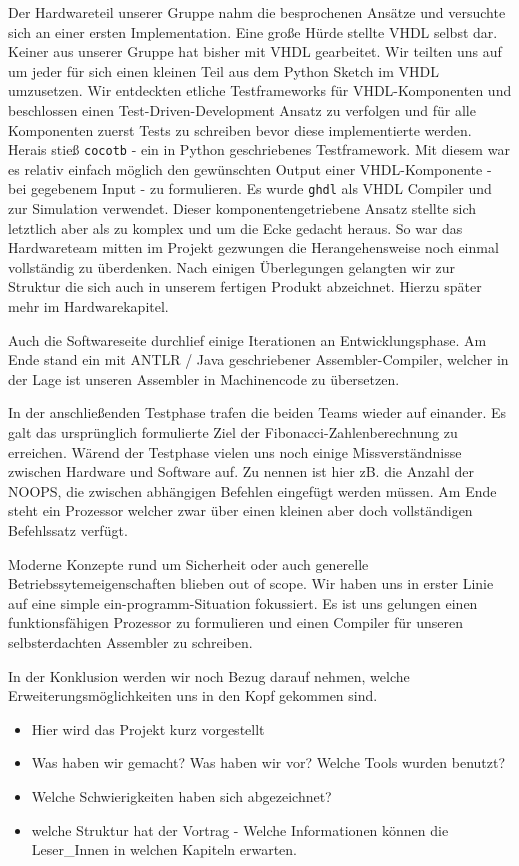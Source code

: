 \documentclass[paper=a4,fontsize=12pt,twocolumn]{scrreprt}
\begin{document}
Der Hardwareteil unserer Gruppe nahm die besprochenen Ansätze und versuchte sich an einer ersten Implementation.
Eine große Hürde stellte VHDL selbst dar.
Keiner aus unserer Gruppe hat bisher mit VHDL gearbeitet.
Wir teilten uns auf um jeder für sich einen kleinen Teil aus dem Python Sketch im VHDL umzusetzen.
Wir entdeckten etliche Testframeworks für VHDL-Komponenten und beschlossen einen Test-Driven-Development Ansatz zu verfolgen und für alle Komponenten zuerst Tests zu schreiben bevor diese implementierte werden.
Herais stieß \texttt{cocotb} - ein in Python geschriebenes Testframework.
Mit diesem war es relativ einfach möglich den gewünschten Output einer VHDL-Komponente - bei gegebenem Input - zu formulieren.
Es wurde \texttt{ghdl} als VHDL Compiler und zur Simulation verwendet.
Dieser komponentengetriebene Ansatz stellte sich letztlich aber als zu komplex und um die Ecke gedacht heraus.
So war das Hardwareteam mitten im Projekt gezwungen die Herangehensweise noch einmal vollständig zu überdenken.
Nach einigen Überlegungen gelangten wir zur Struktur die sich auch in unserem fertigen Produkt abzeichnet.
Hierzu später mehr im Hardwarekapitel.

Auch die Softwareseite durchlief einige Iterationen an Entwicklungsphase.
Am Ende stand ein mit ANTLR / Java geschriebener Assembler-Compiler, welcher in der Lage ist unseren Assembler in Machinencode zu übersetzen.

In der anschließenden Testphase trafen die beiden Teams wieder auf einander.
Es galt das ursprünglich formulierte Ziel der Fibonacci-Zahlenberechnung zu erreichen.
Wärend der Testphase vielen uns noch einige Missverständnisse zwischen Hardware und Software auf.
Zu nennen ist hier zB. die Anzahl der NOOPS, die zwischen abhängigen Befehlen eingefügt werden müssen.
Am Ende steht ein Prozessor welcher zwar über einen kleinen aber doch vollständigen Befehlssatz verfügt.

Moderne Konzepte rund um Sicherheit oder auch generelle Betriebssytemeigenschaften blieben out of scope.
Wir haben uns in erster Linie auf eine simple ein-programm-Situation fokussiert.
Es ist uns gelungen einen funktionsfähigen Prozessor zu formulieren und einen Compiler für unseren selbsterdachten Assembler zu schreiben.

In der Konklusion werden wir noch Bezug darauf nehmen, welche Erweiterungsmöglichkeiten uns in den Kopf gekommen sind.

\begin{itemize}
    \item Hier wird das Projekt kurz vorgestellt
    \item Was haben wir gemacht? Was haben wir vor? Welche Tools wurden benutzt?
    \item Welche Schwierigkeiten haben sich abgezeichnet?
    \item welche Struktur hat der Vortrag - Welche Informationen können die Leser\_Innen in welchen Kapiteln erwarten.
\end{itemize}
\end{document}
